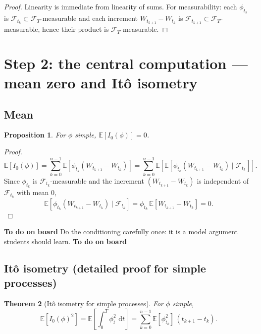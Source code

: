 \documentclass[11pt]{article}
\newcommand{\E}{\mathbb{E}}
\newcommand{\F}{\mathcal{F}}
\newcommand{\1}{\mathbf{1}}
\newcommand{\dd}{\,\mathrm{d}}
\numberwithin{equation}{section}
\theoremstyle{plain}
\newtheorem{theorem}{Theorem}[section]
\newtheorem{proposition}[theorem]{Proposition}
\theoremstyle{definition}
\theoremstyle{remark}
\begin{document}
\begin{proof}
Linearity is immediate from linearity of sums.
For measurability: each $\phi_{t_k}$ is $\F_{t_k}\subset\F_T$-measurable and each increment
$W_{t_{k+1}}-W_{t_k}$ is $\F_{t_{k+1}}\subset\F_T$-measurable, hence their product is $\F_T$-measurable.
\end{proof}

\section{Step 2: the central computation --- mean zero and It\^o isometry}

\subsection{Mean}
\begin{proposition}
For $\phi$ simple, $\E[I_0(\phi)]=0$.
\end{proposition}

\begin{proof}
\[
\E[I_0(\phi)]=\sum_{k=0}^{n-1}\E\!\left[\phi_{t_k}(W_{t_{k+1}}-W_{t_k})\right]
=\sum_{k=0}^{n-1}\E\!\left[\E\!\left[\phi_{t_k}(W_{t_{k+1}}-W_{t_k})\mid \F_{t_k}\right]\right].
\]
Since $\phi_{t_k}$ is $\F_{t_k}$-measurable and the increment $(W_{t_{k+1}}-W_{t_k})$
is independent of $\F_{t_k}$ with mean $0$,
\[
\E\!\left[\phi_{t_k}(W_{t_{k+1}}-W_{t_k})\mid \F_{t_k}\right]
=\phi_{t_k}\,\E[W_{t_{k+1}}-W_{t_k}]=0.
\]
\end{proof}

\textbf{To do on board}
Do the conditioning carefully once: it is a model argument students should learn.
\textbf{To do on board}

\subsection{It\^o isometry (detailed proof for simple processes)}
\begin{theorem}[It\^o isometry for simple processes]
For $\phi$ simple,
\[
\E\!\left[I_0(\phi)^2\right]=\E\!\left[\int_0^T \phi_t^2\,\dd t\right]
=\sum_{k=0}^{n-1}\E[\phi_{t_k}^2]\,(t_{k+1}-t_k).
\]
\end{theorem}
\end{document}
